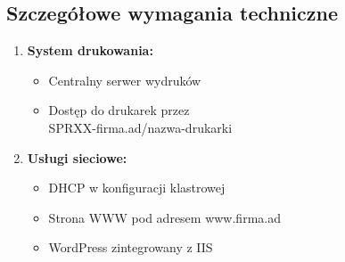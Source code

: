\subsection{Szczegółowe wymagania techniczne}
\begin{enumerate}
    \item \textbf{System drukowania:}
    \begin{itemize}
        \item Centralny serwer wydruków
        \item Dostęp do drukarek przez \\ SPRXX-firma.ad/nazwa-drukarki
    \end{itemize}

    \item \textbf{Usługi sieciowe:}
    \begin{itemize}
        \item DHCP w konfiguracji klastrowej
        \item Strona WWW pod adresem www.firma.ad
        \item WordPress zintegrowany z IIS
    \end{itemize}
\end{enumerate}

